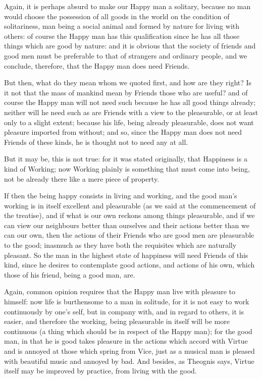 Again, it is perhaps absurd to make our Happy man a solitary, because no man
would choose the possession of all goods in the world on the condition of
solitariness, man being a social animal and formed by nature for living with
others: of course the Happy man has this qualification since he has all those
things which are good by nature: and it is obvious that the society of friends
and good men must be preferable to that of strangers and ordinary people, and
we conclude, therefore, that the Happy man does need Friends.

But then, what do they mean whom we quoted first, and how are they right? Is it
not that the mass of mankind mean by Friends those who are useful? and of
course the Happy man will not need such because he has all good things already;
neither will he need such as are Friends with a view to the pleasurable, or at
least only to a slight extent; because his life, being already pleasurable,
does not want pleasure imported from without; and so, since the Happy man does
not need Friends of these kinds, he is thought not to need any at all.

But it may be, this is not true: for it was stated originally, that Happiness
is a kind of Working; now Working plainly is something that must come into
being, not be already there like a mere piece of property.

If then the being happy consists in living and working, and the good
man’s working is in itself excellent and pleasurable (as we said at the
commencement of the treatise), and if what is our own reckons among things
pleasurable, and if we can view our neighbours better than ourselves and their
actions better than we can our own, then the actions of their Friends who are
good men are pleasurable to the good; inasmuch as they have both the requisites
which are naturally pleasant. So the man in the highest state of happiness will
need Friends of this kind, since he desires to contemplate good actions, and
actions of his own, which those of his friend, being a good man, are.

Again, common opinion requires that the Happy man live with pleasure to
himself: now life is burthensome to a man in solitude, for it is not easy to
work continuously by one’s self, but in company with, and in regard to
others, it is easier, and therefore the working, being pleasurable in itself
will be more continuous (a thing which should be in respect of the Happy man);
for the good man, in that he is good takes pleasure in the actions which accord
with Virtue and is annoyed at those which spring from Vice, just as a musical
man is pleased with beautiful music and annoyed by bad. And besides, as
Theognis says, Virtue itself may be improved by practice, from living with the
good.

